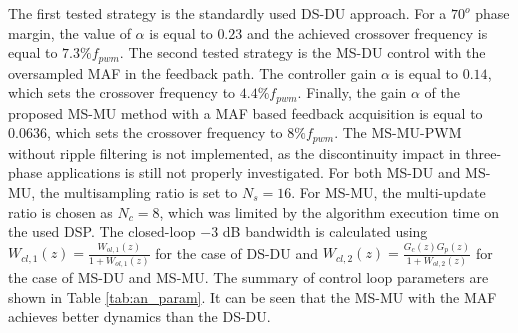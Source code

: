 \documentclass[conference]{IEEEtran}
\begin{document}
The first tested strategy is the standardly used DS-DU approach. For a $70^o$ phase margin, the value of $\alpha$ is equal to $0.23$ and the achieved crossover frequency is equal to $7.3 \% f_{pwm}$.
The second tested strategy is the MS-DU control with the oversampled MAF in the feedback path. The controller gain $\alpha$ is equal to $0.14$, which sets the crossover frequency to $4.4 \% f_{pwm}$.
Finally, the gain $\alpha$ of the proposed MS-MU method with a MAF based feedback acquisition is equal to $0.0636$, which sets the crossover frequency to $8 \%  f_{pwm}$. The MS-MU-PWM without ripple filtering is not implemented, as the discontinuity impact in three-phase applications is still not properly investigated.
For both MS-DU and MS-MU, the multisampling ratio is set to $N_s = 16$. For MS-MU, the multi-update ratio is chosen as $N_c = 8$, which was limited by the algorithm execution time on the used DSP.
The closed-loop $-3$ dB bandwidth is calculated using $W_{cl,1}(z) = \frac{W_{ol,1}(z)}{1+W_{ol,1}(z)}$ for the case of DS-DU and $W_{cl,2}(z) = \frac{G_c(z) G_p(z)}{1+W_{ol,2}(z)}$ for the case of MS-DU and MS-MU. The summary of control loop parameters are shown in Table \ref{tab:an_param}. It can be seen that the MS-MU with the MAF achieves better dynamics than the DS-DU.
\end{document}
